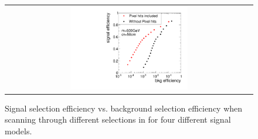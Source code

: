 \begin{figure}[!bt]
\begin{tabular}{c}
    \includegraphics[width=0.49\textwidth]{figures/analysis/rocplot_wjets_mass_500GeV_ctau_50cm.pdf}
  \end{tabular}
  \caption{Signal selection efficiency vs. background selection efficiency when scanning through different selections in \ias for four different signal models.}
  \label{fig:ROCplots}
\end{figure} 
